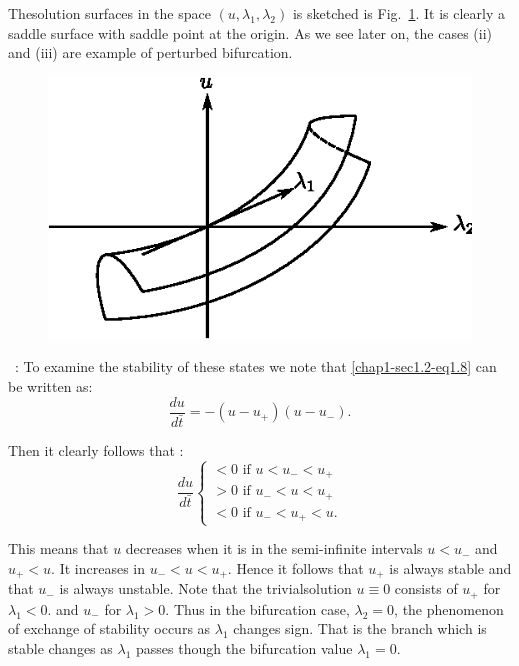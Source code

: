 The\pageoriginale solution surfaces in the space $(u, \lambda_1, \lambda_2)$ is
sketched is Fig.~\ref{chap1-sec1.2-fig1.4}. It is clearly a saddle
surface with saddle 
point at the origin. As we see later on, the cases (ii) and (iii)
are example of perturbed bifurcation.  

\begin{figure}[H]
\centering
\includegraphics{vol79-fig/fig79-4.eps}
\smallskip
\caption{}
\label{chap1-sec1.2-fig1.4}
\end{figure}

\medskip
{}~: To examine the stability of these
states we note that \eqref{chap1-sec1.2-eq1.8} can be written as: 
\begin{equation*}
\frac{du}{d\bar{t}}= - (u-u_+)(u-u_-).\tag{1.11}\label{chap1-sec1.2-eq1.11}
\end{equation*}

\noindent
Then it clearly follows that :
\begin{equation*}
\frac{du}{d\bar{t}} 
\begin{cases}
<  0  \text{  if  } u < u_- < u_+\\
>  0  \text{  if  } u_- < u < u_+\\
<  0  \text{  if  } u_- < u_+ < u.
\end{cases}\tag{1.12}\label{chap1-sec1.2-eq1.12}
\end{equation*}

This means that $u$ decreases when it is in the semi-infinite
intervals $u < u_-$ and $u_+ < u$. It increases in  $u_- < u <
u_+$. Hence it follows that $u_+$ is always stable and that $u_-$ is
always unstable. Note that the trivial\pageoriginale solution $u
\equiv 0$ consists of 
$u_+$   for  $\lambda_1 < 0$. and $u_-$ for $\lambda_1 > 0$. Thus in
the bifurcation case, $\lambda_2 = 0$, the phenomenon of  exchange of
stability occurs as $\lambda_1$ changes sign. That is the branch which
is stable changes as $\lambda_1$ passes though the bifurcation value
$\lambda_1 = 0$. 


